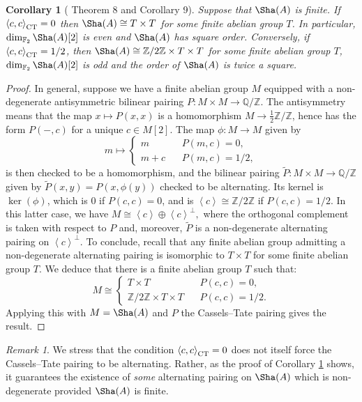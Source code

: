 \documentclass[10pt]{amsart}
\numberwithin{equation}{section}
\newtheorem{cor}[equation]{Corollary}
\theoremstyle{remark}
\newtheorem{remark}[equation]{Remark}
\theoremstyle{definition}
\theoremstyle{definition}
\theoremstyle{definition}
\theoremstyle{definition}
\theoremstyle{definition}
\theoremstyle{definition}
\theoremstyle{definition}
\theoremstyle{definition}
\begin{document}
\begin{cor}[\cite{MR1740984} Theorem 8 and Corollary 9] \label{PS:cor}
Suppose that $\Sha(A)$ is finite. If $\left \langle c,c\right \rangle_{\textup{CT}}=0$ then $\Sha(A)\cong T\times T$ for some finite abelian group $T$. In particular, $\dim_{\mathbb{F}_2}\Sha(A)[2]$ is even and $\Sha(A)$ has square order. Conversely, if $\left \langle c,c\right \rangle_{\textup{CT}}=1/2$, then $\Sha(A)\cong \mathbb{Z}/2\mathbb{Z}\times T\times T$ for some finite abelian group $T$, $\dim_{\mathbb{F}_2}\Sha(A)[2]$ is odd and the order of $\Sha(A)$ is twice a square. 
\end{cor}



\begin{proof} 
In general, suppose we have a finite abelian group $M$ equipped with a non-degenerate  antisymmetric bilinear pairing $P:M\times M\to \mathbb{Q}/\mathbb{Z}$. The antisymmetry means that the map $x\mapsto P(x,x)$ is a homomorphism $M\to \tfrac{1}{2}\mathbb{Z}/\mathbb{Z}$, hence has the form $P(-,c)$ for a unique $c\in M[2]$. The map $\phi:M\to M$ given by 
\[m\mapsto \begin{cases}m~~&~~P(m,c)=0,\\ m+c~~&~~P(m,c)=1/2, \end{cases}\]
is then checked to be a homomorphism, and the bilinear pairing $\widetilde{P}:M\times M\to \mathbb{Q}/\mathbb{Z}$ given by $\widetilde{P}(x,y)=P(x,\phi(y))$ checked to be alternating. Its kernel is $\ker(\phi)$, which is $0$ if $P(c,c)=0$, and is $\left \langle c\right \rangle \cong \mathbb{Z}/2\mathbb{Z}$ if $P(c,c)=1/2$. In this latter case, we have $M\cong \left \langle c\right \rangle \oplus  \left \langle c\right \rangle^\perp,$ where the orthogonal complement is taken with respect to $P$ and, moreover, $\widetilde{P}$ is a non-degenerate alternating pairing on $\left \langle c\right \rangle^{\perp}$. To conclude, recall that any finite abelian group admitting a non-degenerate alternating pairing is isomorphic to $T\times T$ for some finite abelian group $T$. We deduce that there is a finite abelian group $T$ such that:
\[M\cong \begin{cases}T\times T~~&~~P(c,c)=0,\\ \mathbb{Z}/2\mathbb{Z}\times T\times T~~&~~P(c,c)=1/2. \end{cases}\]
 Applying this with $M=\Sha(A)$ and $P$ the Cassels--Tate pairing gives the result.
\end{proof}

\begin{remark}
We stress that the condition $\left \langle c,c\right \rangle_{\textup{CT}}=0$ does not itself force the Cassels--Tate pairing to be alternating. Rather, as the proof of Corollary \ref{PS:cor} shows, it guarantees the existence of \textit{some} alternating pairing on $\Sha(A)$ which is non-degenerate provided $\Sha(A)$ is finite.  
\end{remark}
\end{document}
